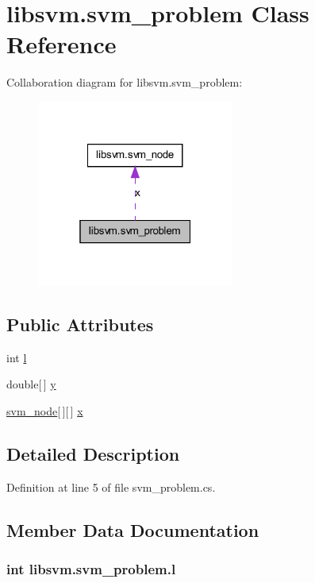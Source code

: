 \hypertarget{classlibsvm_1_1svm__problem}{
\section{libsvm.svm\_\-problem Class Reference}
\label{classlibsvm_1_1svm__problem}
}


Collaboration diagram for libsvm.svm\_\-problem:
\nopagebreak
\begin{figure}[H]
\begin{center}
\leavevmode
\includegraphics[width=184pt]{classlibsvm_1_1svm__problem__coll__graph}
\end{center}
\end{figure}
\subsection*{Public Attributes}
\begin{DoxyCompactItemize}
\item 
int \hyperlink{classlibsvm_1_1svm__problem_a78ab8d08e1ebc7279adfae2e24683c54}{l}
\item 
double\mbox{[}$\,$\mbox{]} \hyperlink{classlibsvm_1_1svm__problem_affe2ee311a71216facc4f22c9ebae0d3}{y}
\item 
\hyperlink{classlibsvm_1_1svm__node}{svm\_\-node}\mbox{[}$\,$\mbox{]}\mbox{[}$\,$\mbox{]} \hyperlink{classlibsvm_1_1svm__problem_ab551d9238bf36c4ba83c018569b09fbb}{x}
\end{DoxyCompactItemize}


\subsection{Detailed Description}


Definition at line 5 of file svm\_\-problem.cs.



\subsection{Member Data Documentation}
\hypertarget{classlibsvm_1_1svm__problem_a78ab8d08e1ebc7279adfae2e24683c54}{
\subsubsection[{l}]{\setlength{\rightskip}{0pt plus 5cm}int {\bf libsvm.svm\_\-problem.l}}}
\label{classlibsvm_1_1svm__problem_a78ab8d08e1ebc7279adfae2e24683c54}


